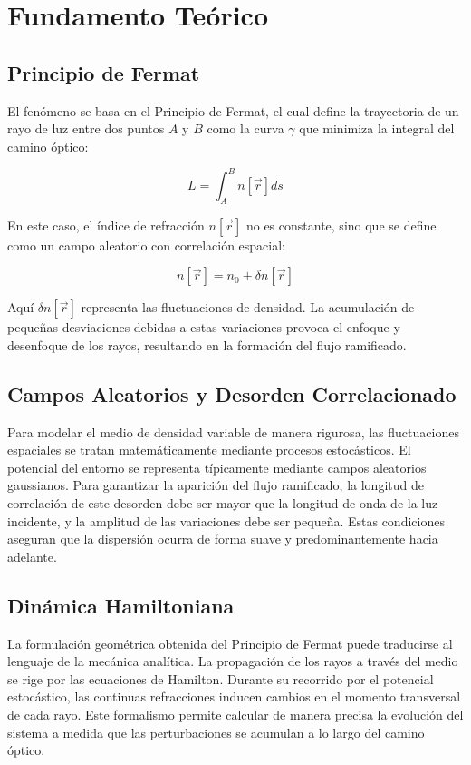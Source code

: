 \chapter{Fundamento Teórico}


\section{Principio de Fermat}
El fenómeno se basa en el Principio de Fermat, el cual define la trayectoria de un rayo de luz entre dos puntos $A$ y $B$ como la curva $\gamma$ que minimiza la integral del camino óptico:

$$L = \int_{A}^{B} n[\vec{r}] ds$$

En este caso, el índice de refracción $n[\vec{r}]$ no es constante, sino que se define como un campo aleatorio con correlación espacial:

$$n[\vec{r}] = n_0 + \delta n[\vec{r}]$$

Aquí $\delta n[\vec{r}]$ representa las fluctuaciones de densidad. La acumulación de pequeñas desviaciones debidas a estas variaciones provoca el enfoque y desenfoque de los rayos, resultando en la formación del flujo ramificado.


\section{Campos Aleatorios y Desorden Correlacionado}
Para modelar el medio de densidad variable de manera rigurosa, las fluctuaciones espaciales se tratan matemáticamente mediante procesos estocásticos. El potencial del entorno se representa típicamente mediante campos aleatorios gaussianos. Para garantizar la aparición del flujo ramificado, la longitud de correlación de este desorden debe ser mayor que la longitud de onda de la luz incidente, y la amplitud de las variaciones debe ser pequeña. Estas condiciones aseguran que la dispersión ocurra de forma suave y predominantemente hacia adelante.

\section{Dinámica Hamiltoniana}
La formulación geométrica obtenida del Principio de Fermat puede traducirse al lenguaje de la mecánica analítica. La propagación de los rayos a través del medio se rige por las ecuaciones de Hamilton. Durante su recorrido por el potencial estocástico, las continuas refracciones inducen cambios en el momento transversal de cada rayo. Este formalismo permite calcular de manera precisa la evolución del sistema a medida que las perturbaciones se acumulan a lo largo del camino óptico.

